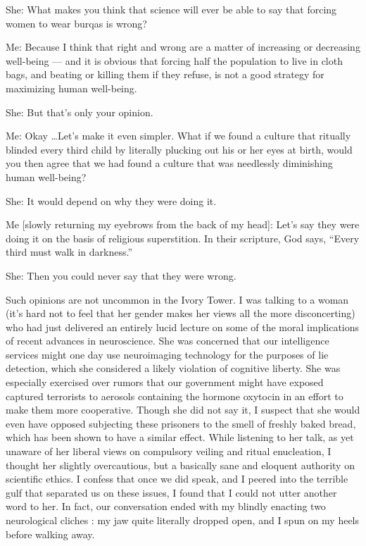 \documentclass[a4paper,14pt]{extarticle}
\begin{document}
She:
What makes you think that science will ever be able to say that forcing women to wear burqas is wrong?

Me:
Because I think that right and wrong are a matter of increasing or decreasing well-being --- and it is obvious that forcing half the population to live in cloth bags, and beating or killing them if they refuse, is not a good strategy for maximizing human well-being.

She:
But that's only your opinion.

Me:
Okay \dots Let's make it even simpler.
What if we found a culture that ritually blinded every third child by literally plucking out his or her eyes at birth, would you then agree that we had found a culture that was needlessly diminishing human well-being?

She:
It would depend on why they were doing it.

Me [slowly returning my eyebrows from the back of my head]:
Let's say they were doing it on the basis of religious superstition.
In their scripture, God says, ``Every third must walk in darkness.''

She:
Then you could never say that they were wrong.

Such opinions are not uncommon in the Ivory Tower.
I was talking to a woman (it's hard not to feel that her gender makes her views all the more disconcerting) who had just delivered an entirely lucid lecture on some of the moral implications of recent advances in neuroscience.
She was concerned that our intelligence services might one day use neuroimaging technology for the purposes of lie detection, which she considered a likely violation of cognitive liberty.
She was especially exercised over rumors that our government might have exposed captured terrorists to aerosols containing the hormone oxytocin in an effort to make them more cooperative.
Though she did not say it, I suspect that she would even have opposed subjecting these prisoners to the smell of freshly baked bread, which has been shown to have a similar effect.
While listening to her talk, as yet unaware of her liberal views on compulsory veiling and ritual enucleation, I thought her slightly overcautious, but a basically sane and eloquent authority on scientific ethics.
I confess that once we did speak, and I peered into the terrible gulf that separated us on these issues, I found that I could not utter another word to her.
In fact, our conversation ended with my blindly enacting two neurological cliches :
my jaw quite literally dropped open, and I spun on my heels before walking away.
\end{document}
